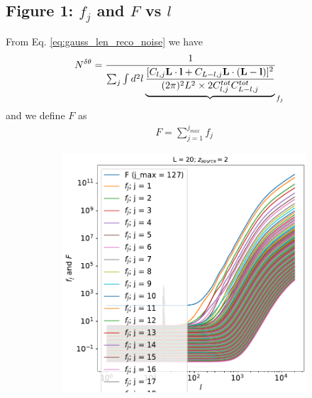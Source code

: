 \documentclass[12pt]{article}
\def\l{{\bf l}}
\def\L{{\bf L}}
\numberwithin{equation}{section}
\begin{document}
\subsection{Figure 1: $ f_j $ and $ F $ vs $ l $}
From Eq. \eqref{eq:gauss_len_reco_noise} we have
\begin{align}
N^{\delta\theta} &= \frac{1}{\sum_{j}\int d^2 l  \underbrace{\frac{[C_{l,j} \L\cdot \l +
		C_{L-l,j} \L\cdot (\L-\l)]^2}{(2\pi)^2L^2  \times 2C^{tot}_{l,j}C^{tot}_{L-l,j}} }}_{f_j}
\end{align}
and we define $ F $ as 
\begin{align}
F = \sum_{j = 1}^{j_{max}} f_j
\end{align}

\begin{figure}[h]
	\centering
	\begin{subfigure}{0.49\textwidth}
		\centering
		\includegraphics[width=\textwidth]{L_20}
		\caption{}
	\end{subfigure}
	\begin{subfigure}{0.49\textwidth}
		\centering

\end{subfigure}
\end{figure}
\end{document}
